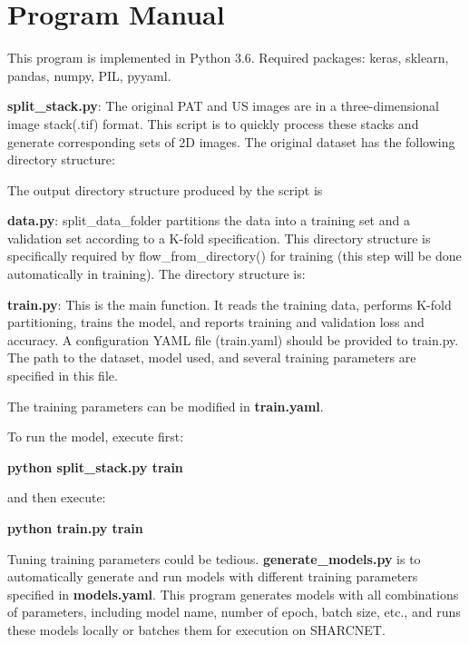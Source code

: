 \chapter{Program Manual} %
\label{appendixA}

This program is implemented in Python 3.6.
Required packages: keras, sklearn, pandas, numpy, PIL, pyyaml.

\textbf{split\_stack.py}: The original PAT and US images are in a three-dimensional image stack(.tif) format. This script is to quickly process these stacks and generate corresponding sets of 2D images.
The original dataset has the following directory structure:

The output directory structure produced by the script is

\textbf{data.py}: split\_data\_folder partitions the data into a training set and a validation set according to a K-fold specification. This directory structure is specifically required by flow\_from\_directory() for training (this step will be done automatically in training). The directory structure is:

\textbf{train.py}: This is the main function. It reads the training data, performs K-fold partitioning, trains the model, and reports training and validation loss and accuracy. A configuration YAML file (train.yaml) should be provided to train.py. The path to the dataset, model used, and several training parameters are specified in this file.

The training parameters can be modified in \textbf{train.yaml}.

To run the model, execute first:

\textbf{python split\_stack.py train}

and then execute:

\textbf{python train.py train}

Tuning training parameters could be tedious. \textbf{generate\_models.py} is to automatically generate and run models with different training parameters specified in \textbf{models.yaml}. This program generates models with all combinations of parameters, including model name, number of epoch, batch size, etc., and runs these models locally or batches them for execution on SHARCNET.